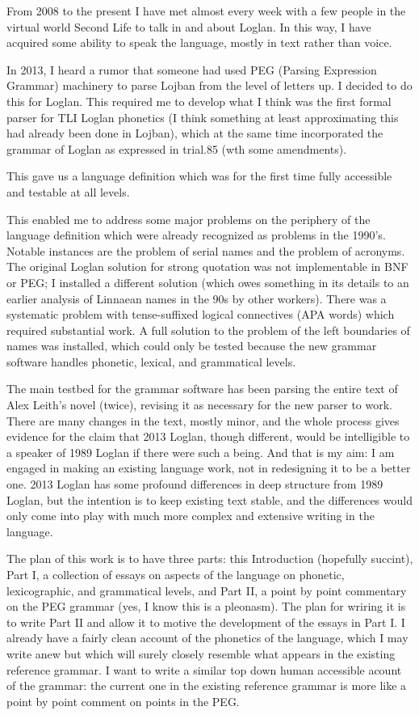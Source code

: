 \documentclass[12pt]{article}
\begin{document}
From 2008 to the present I have met almost every week with a few people in the virtual world Second Life to talk in and about Loglan.  In this way, I have acquired some ability to speak the language, mostly in text rather than voice.

In 2013, I heard a rumor that someone had used PEG (Parsing Expression Grammar) machinery to parse Lojban from the level of letters up.  I decided to do this for Loglan.  This required me to develop what I think was the first formal parser for TLI Loglan phonetics (I think something at least approximating this had already been done in Lojban), which at the same time incorporated the grammar of Loglan as expressed in trial.85 (wth some amendments).

This gave us a language definition which was for the first time fully accessible and testable at all levels.

This enabled me to address some major problems on the periphery of the language definition which were already recognized as problems in the 1990's.  Notable instances are the problem of serial names and the problem of acronyms.  The original Loglan solution for strong quotation was not implementable in BNF or PEG;  I installed a different solution (which owes something in its details to an earlier analysis of Linnaean names in the 90s by other workers).  There was a systematic problem with tense-suffixed logical connectives (APA words) which required substantial work.  A full solution to the problem of the left boundaries of names was installed, which could only be tested because the new grammar software handles phonetic, lexical, and grammatical levels.

The main testbed for the grammar software has been parsing the entire text of Alex Leith's novel (twice),
revising it as necessary for the new parser to work.  There are many changes in the text, mostly minor, and the whole process gives evidence for the claim that 2013 Loglan, though different, would be intelligible to a speaker of 1989 Loglan if there were such a being.  And that is my aim:  I am engaged in making an existing language work, not in redesigning it to be a better one.   2013 Loglan has some profound differences in deep structure from 1989 Loglan, but the intention is to keep existing text stable, and the differences would only come into play with much more complex and extensive writing in the language.

The plan of this work is to have three parts:  this Introduction (hopefully succint), Part I, a collection of essays on aspects of the language on phonetic, lexicographic, and grammatical levels, and Part II, a point by point commentary on the PEG grammar (yes, I know this is a pleonasm).  The plan for wriring it is to write Part II and allow it to motive the development of the essays in Part I.  I already have a fairly clean account of the phonetics of the language, which I may write anew but which will surely closely resemble what appears in the existing reference grammar.  I want to write a similar top down human accessible acount of the grammar:  the current one in the existing reference grammar is more like a point by point comment on points in the PEG.
\end{document}
